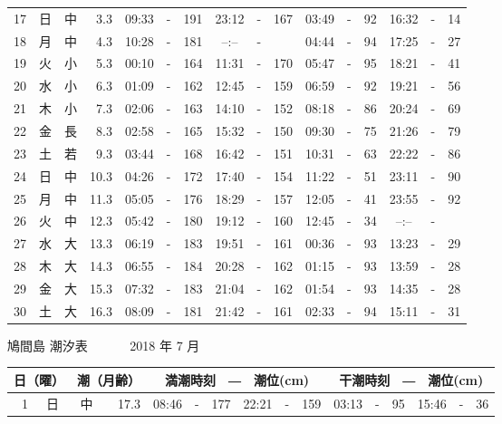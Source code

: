 \documentclass[12pt.a4j]{jsarticle}
\begin{document}
\begin{center}
\begin{table}[ht]
\begin{tabular}{|rc|cr|ccrccr|ccrccr|}
17 & 日 & 中 &  3.3 &  09:33 &-& 191  &  23:12 &-& 167  &   03:49 &-&  92  &   16:32 &-&  14  \\
18 & 月 & 中 &  4.3 &  10:28 &-& 181  &  --:-- &-&     &   04:44 &-&  94  &   17:25 &-&  27  \\
19 & 火 & 小 &  5.3 &  00:10 &-& 164  &  11:31 &-& 170  &   05:47 &-&  95  &   18:21 &-&  41  \\
20 & 水 & 小 &  6.3 &  01:09 &-& 162  &  12:45 &-& 159  &   06:59 &-&  92  &   19:21 &-&  56  \\
21 & 木 & 小 &  7.3 &  02:06 &-& 163  &  14:10 &-& 152  &   08:18 &-&  86  &   20:24 &-&  69  \\
22 & 金 & 長 &  8.3 &  02:58 &-& 165  &  15:32 &-& 150  &   09:30 &-&  75  &   21:26 &-&  79  \\
23 & 土 & 若 &  9.3 &  03:44 &-& 168  &  16:42 &-& 151  &   10:31 &-&  63  &   22:22 &-&  86  \\
24 & 日 & 中 & 10.3 &  04:26 &-& 172  &  17:40 &-& 154  &   11:22 &-&  51  &   23:11 &-&  90  \\
25 & 月 & 中 & 11.3 &  05:05 &-& 176  &  18:29 &-& 157  &   12:05 &-&  41  &   23:55 &-&  92  \\
26 & 火 & 中 & 12.3 &  05:42 &-& 180  &  19:12 &-& 160  &   12:45 &-&  34  &   --:-- &-&     \\
27 & 水 & 大 & 13.3 &  06:19 &-& 183  &  19:51 &-& 161  &   00:36 &-&  93  &   13:23 &-&  29  \\
28 & 木 & 大 & 14.3 &  06:55 &-& 184  &  20:28 &-& 162  &   01:15 &-&  93  &   13:59 &-&  28  \\
29 & 金 & 大 & 15.3 &  07:32 &-& 183  &  21:04 &-& 162  &   01:54 &-&  93  &   14:35 &-&  28  \\
30 & 土 & 大 & 16.3 &  08:09 &-& 181  &  21:42 &-& 161  &   02:33 &-&  94  &   15:11 &-&  31  \\
   \hline
   \end{tabular}
\end{table}
\newpage
 {\LARGE 鳩間島  潮汐表　　　}
 {\large 2018 年  7 月}\\
 \begin{table}[ht]
    \begin{tabular}{|rc|cr|ccrccr|ccrccr|}
    \hline
    \multicolumn{2}{|c|}{日（曜）} & \multicolumn{2}{c|}{潮（月齢）} & \multicolumn{6}{c|}{満潮時刻　―　潮位(cm)} & \multicolumn{6}{c|}{干潮時刻　―　潮位(cm)} \\
 \hline
 1 & 日 & 中 & 17.3 &  08:46 &-& 177  &  22:21 &-& 159  &   03:13 &-&  95  &   15:46 &-&  36  \\

\end{tabular}
\end{table}
\end{center}
\end{document}
